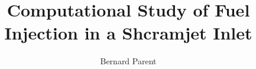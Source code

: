 \documentclass[10pt,twoside]{waflthesis}
\author{
  Bernard Parent
}
\title{
  Computational Study of Fuel Injection in a Shcramjet Inlet 
}
\begin{document}
  \makewafltitle
  \pagestyle{plain}    %
  \pagestyle{headings}
  \setcounter{page}{2} %
  \makeabstract
  \linespread{1.2} %
  \tableofcontents
  \makenomenclature
  \makeacknowledgements
  \makededication

  \newpage
  \pagestyle{headings}  
  \setcounter{page}{1}

  \appendix
  

  \nocite{jcp:2002:parent,aiaaconf:2001:parent,aiaa:2002:parent,aiaa:2003:parent,aiaa:2003:parent:2,
          jpp:2003:sislian,aiaaconf:2002:sislian}
  
  
\end{document}
